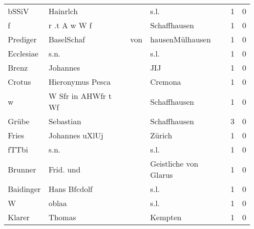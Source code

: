 \begin{tabular}{llllrr}
                    bSSiV &                           Hainrlch &             &                                        s.l. &          1 &         0 \\
                        f &                       r .t A w W f &             &                                Schaffhausen &          1 &         0 \\
                 Prediger &                         BaselSchaf &         von &                             hausenMülhausen &          1 &         0 \\
                Ecclesiae &                               s.n. &             &                                        s.l. &          1 &         0 \\
                    Brenz &                           Johannes &             &                                         JIJ &          1 &         0 \\
                   Crotus &                   Hieronymus Pesca &             &                                     Cremona &          1 &         0 \\
                        w &                W Sfr in AHWfr t Wf &             &                                Schaffhausen &          1 &         0 \\
                    Grübe &                          Sebastian &             &                                Schaffhausen &          3 &         0 \\
                    Fries &                     Johannes uXlUj &             &                                      Zürich &          1 &         0 \\
                    fTTbi &                               s.n. &             &                                        s.l. &          1 &         0 \\
                  Brunner &                          Frid. und &             &                       Geistliche von Glarus &          1 &         0 \\
                Baidinger &                       Hans Bfcdolf &             &                                        s.l. &          1 &         0 \\
                        W &                              oblaa &             &                                        s.l. &          1 &         0 \\
                   Klarer &                             Thomas &             &                                     Kempten &          1 &         0 \\

\end{tabular}
